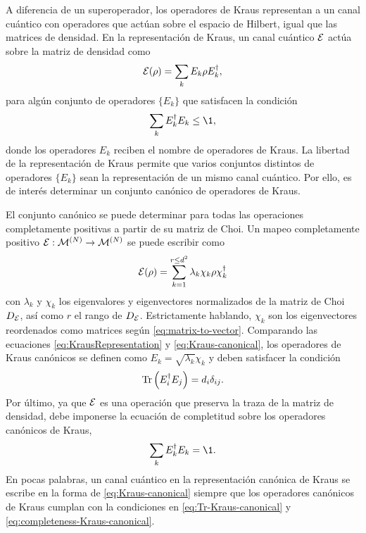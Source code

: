A diferencia de un superoperador, los operadores de Kraus representan
a un canal cuántico con operadores que actúan sobre el espacio 
de Hilbert, igual que las matrices de densidad. En la representación 
de Kraus, un canal cuántico $\mathcal{E}$ actúa sobre la matriz 
de densidad como
\begin{align}\label{eq:KrausRepresentation}
\mathcal{E}\qty(\rho)=\sum_k E_k\rho E_k^{\dagger},
\end{align}
para algún conjunto de operadores $\{E_k\}$ que satisfacen la 
condición~\cite{nielsen_chuang_2011}
\begin{align}
\sum _kE_k^{\dagger}E_k\leq\1,
\end{align} 
donde los operadores $E_k$ reciben el nombre de operadores de Kraus.
La libertad de la representación de Kraus permite que 
varios conjuntos distintos de operadores $\{E_k\}$ sean la representación
de un mismo canal cuántico. Por ello, es de interés
determinar un conjunto canónico de operadores de Kraus.

El conjunto canónico se puede determinar para todas las operaciones 
completamente positivas a partir de su matriz de Choi. Un mapeo 
completamente positivo $\mathcal{E}:\mathcal{M}^{(N)}\to\mathcal{M}^{(N)}$ 
se puede escribir como~\citep{bengtsson_zyczkowski_2017}
\begin{align}
\mathcal{E}(\rho) = 
\sum_{k=1}^{r\leq d^2}\lambda_k\chi_k\rho\chi_k^{\dagger}
\label{eq:Kraus-canonical}
\end{align}
con $\lambda_k$ y $\chi_k$ los eigenvalores y eigenvectores 
normalizados de la matriz de Choi $D_{\mathcal{E}}$, así como $r$ el rango 
de $D_{\mathcal{E}}$. 
Estrictamente hablando, $\chi_k$ son los eigenvectores reordenados 
como matrices según \eqref{eq:matrix-to-vector}.
Comparando las ecuaciones \eqref{eq:KrausRepresentation} y
\eqref{eq:Kraus-canonical}, los operadores de Kraus canónicos 
se definen como $E_k=\sqrt{\lambda_k}\chi_k$ y deben satisfacer
la condición
\begin{align}
  \Tr\qty(E_i^{\dagger}E_j)=d_i\delta_{ij}.
  \label{eq:Tr-Kraus-canonical}
\end{align}
Por último, ya que $\mathcal{E}$ es una operación que preserva la traza de 
la matriz de densidad, debe imponerse la ecuación de completitud 
sobre los operadores canónicos de Kraus,
\begin{align}
  \sum_kE_k^{\dagger}E_k=\1.
  \label{eq:completeness-Kraus-canonical}
\end{align}
En pocas palabras, un canal cuántico en la representación canónica de 
Kraus se escribe en la forma de \eqref{eq:Kraus-canonical}
siempre que los operadores canónicos de Kraus cumplan con 
la condiciones en \eqref{eq:Tr-Kraus-canonical} y 
\eqref{eq:completeness-Kraus-canonical}. 

